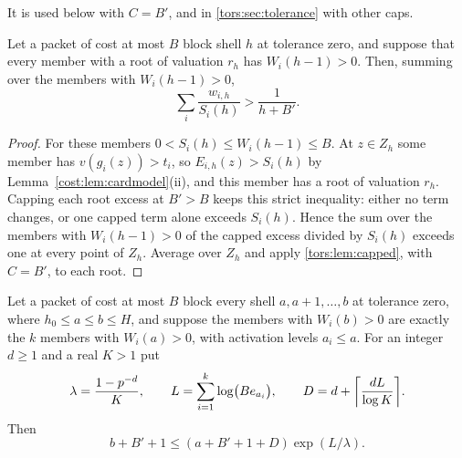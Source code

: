 It is used below with $C=B'$, and in \cref{tors:sec:tolerance} with other caps.

\begin{lemma}\label{cost:lem:cardforced}
Let a packet of cost at most $B$ block shell $h$ at tolerance zero, and suppose that every
member with a root of valuation $r_h$ has $W_i(h-1)>0$. Then, summing over the members with
$W_i(h-1)>0$,
\begin{equation}\label{cost:eq:forced}
 \sum_i\frac{w_{i,h}}{S_i(h)}>\frac1{h+B'} .
\end{equation}
\end{lemma}

\begin{proof}
For these members $0<S_i(h)\le W_i(h-1)\le B$. At $z\in Z_h$ some member has
$v(g_i(z))>t_i$, so $E_{i,h}(z)>S_i(h)$ by Lemma~\ref{cost:lem:cardmodel}(ii), and this member
has a root of valuation $r_h$. Capping each root excess at $B'>B$ keeps this strict
inequality: either no term changes, or one capped term alone exceeds $S_i(h)$. Hence the sum
over the members with $W_i(h-1)>0$ of the capped excess divided by $S_i(h)$ exceeds one at
every point of $Z_h$. Average over $Z_h$ and apply \cref{tors:lem:capped}, with $C=B'$, to
each root.
\end{proof}

\begin{lemma}\label{cost:lem:cardinterval}
Let a packet of cost at most $B$ block every shell $a,a+1,\dots,b$ at tolerance zero, where
$h_0\le a\le b\le H$, and suppose the members with $W_i(b)>0$ are exactly the $k$ members with
$W_i(a)>0$, with activation levels $a_i\le a$. For an integer $d\ge1$ and a real $K>1$ put
\[
 \lambda=\frac{1-p^{-d}}K,\qquad L=\sum_{i=1}^k\log\bigl(Be_{a_i}\bigr),\qquad
 D=d+\ceil*{\frac{dL}{\log K}} .
\]
Then
\begin{equation}\label{cost:eq:interval}
 b+B'+1\le(a+B'+1+D)\exp(L/\lambda).
\end{equation}
\end{lemma}

